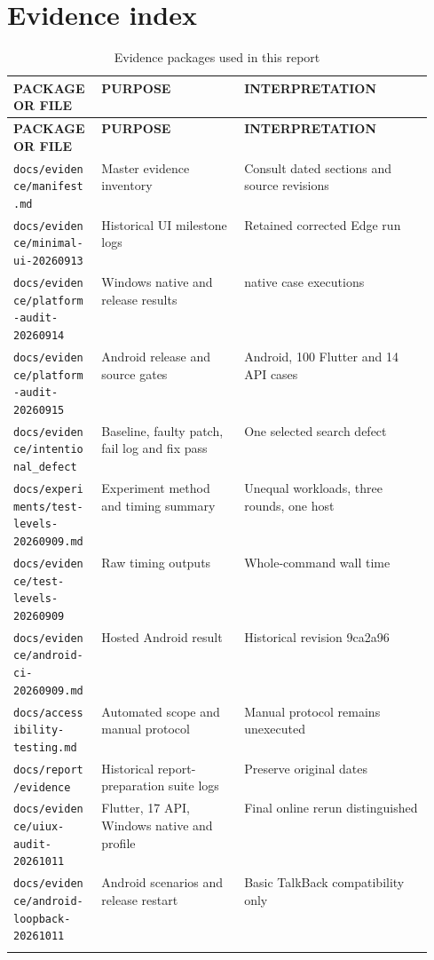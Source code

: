 \documentclass[12pt,a4paper,oneside]{report}
\begin{document}
\chapter{Evidence index}
{\fontsize{11}{14}\selectfont\setlength{\tabcolsep}{4pt}\renewcommand{\arraystretch}{1.15}
\begin{longtable}{@{}>{\raggedright\arraybackslash}p{0.21\linewidth}>{\raggedright\arraybackslash}p{0.34\linewidth}>{\raggedright\arraybackslash}p{}@{}}
\caption{Evidence packages used in this report}\\\toprule
\textbf{PACKAGE OR FILE} & \textbf{PURPOSE} & \textbf{INTERPRETATION} \\ \midrule
\endfirsthead\toprule
\textbf{PACKAGE OR FILE} & \textbf{PURPOSE} & \textbf{INTERPRETATION} \\ \midrule
\endhead
\nolinkurl{docs/evidence/manifest.md} & Master evidence inventory & Consult dated sections and source revisions \\ \addlinespace[5pt]
\nolinkurl{docs/evidence/minimal-ui-20260913} & Historical UI milestone logs & Retained corrected Edge run \\ \addlinespace[5pt]
\nolinkurl{docs/evidence/platform-audit-20260914} & Windows native and release results & 15 native case executions \\ \addlinespace[5pt]
\nolinkurl{docs/evidence/platform-audit-20260915} & Android release and source gates & 15 Android, 100 Flutter and 14 API cases \\ \addlinespace[5pt]
\nolinkurl{docs/evidence/intentional_defect} & Baseline, faulty patch, fail log and fix pass & One selected search defect \\ \addlinespace[5pt]
\nolinkurl{docs/experiments/test-levels-20260909.md} & Experiment method and timing summary & Unequal workloads, three rounds, one host \\ \addlinespace[5pt]
\nolinkurl{docs/evidence/test-levels-20260909} & Raw timing outputs & Whole-command wall time \\ \addlinespace[5pt]
\nolinkurl{docs/evidence/android-ci-20260909.md} & Hosted Android result & Historical revision 9ca2a96 \\ \addlinespace[5pt]
\nolinkurl{docs/accessibility-testing.md} & Automated scope and manual protocol & Manual protocol remains unexecuted \\ \addlinespace[5pt]
\nolinkurl{docs/report/evidence} & Historical report-preparation suite logs & Preserve original dates \\ \addlinespace[5pt]
\nolinkurl{docs/evidence/uiux-audit-20261011} & 133 Flutter, 17 API, Windows native and profile & Final online rerun distinguished \\ \addlinespace[5pt]
\nolinkurl{docs/evidence/android-loopback-20261011} & 15 Android scenarios and release restart & Basic TalkBack compatibility only \\ \addlinespace[5pt]
\bottomrule\end{longtable}}
\end{document}
